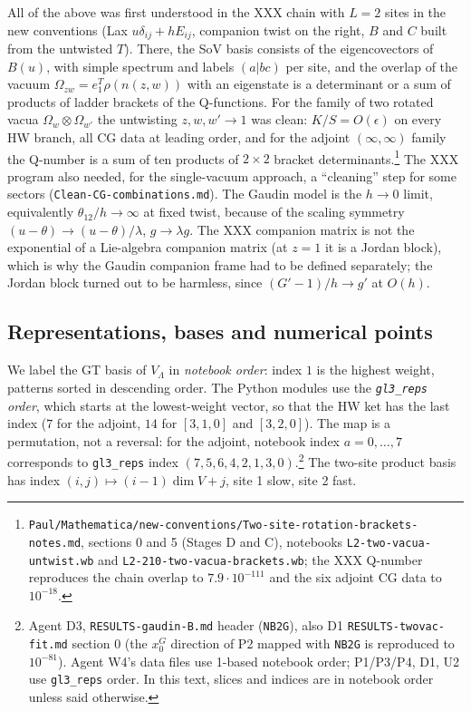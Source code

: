 \documentclass[11pt]{article}
\begin{document}
All of the above was first understood in the XXX chain with $L=2$ sites in the new conventions (Lax $u\delta_{ij}+hE_{ij}$, companion twist on the right, $B$ and $C$ built from the untwisted $T$).
There, the SoV basis consists of the eigencovectors of $B(u)$, with simple spectrum and labels $(a|bc)$ per site, and the overlap of the vacuum $\Omega_{zw}=e_1^T\rho(n(z,w))$ with an eigenstate is a determinant or a sum of products of ladder brackets of the Q-functions.
For the family of two rotated vacua $\Omega_w\otimes\Omega_{w'}$ the untwisting $z,w,w'\to1$ was clean: $K/S=O(\epsilon)$ on every HW branch, all CG data at leading order, and for the adjoint $(\infty,\infty)$ family the Q-number is a sum of ten products of $2\times2$ bracket determinants.\footnote{\texttt{Paul/\allowbreak{}Mathematica/\allowbreak{}new-\allowbreak{}conventions/\allowbreak{}Two-\allowbreak{}site-\allowbreak{}rotation-\allowbreak{}brackets-\allowbreak{}notes.\allowbreak{}md}, sections 0 and 5 (Stages D and C), notebooks \texttt{L2-\allowbreak{}two-\allowbreak{}vacua-\allowbreak{}untwist.\allowbreak{}wb} and \texttt{L2-\allowbreak{}210-\allowbreak{}two-\allowbreak{}vacua-\allowbreak{}brackets.\allowbreak{}wb}; the XXX Q-number reproduces the chain overlap to $7.9\cdot10^{-111}$ and the six adjoint CG data to $10^{-18}$.} The XXX program also needed, for the single-vacuum approach, a ``cleaning'' step for some sectors (\texttt{Clean-\allowbreak{}CG-\allowbreak{}combinations.\allowbreak{}md}).
The Gaudin model is the $h\to0$ limit, equivalently $\theta_{12}/h\to\infty$ at fixed twist, because of the scaling symmetry $(u-\theta)\to(u-\theta)/\lambda$, $g\to\lambda g$. The XXX companion matrix is not the exponential of a Lie-algebra companion matrix (at $z=1$ it is a Jordan block), which is why the Gaudin companion frame had to be defined separately; the Jordan block turned out to be harmless, since $(G'-1)/h\to g'$ at $O(h)$.

\subsection{Representations, bases and numerical points}\label{sec:points}

We label the GT basis of $V_\Lambda$ in \emph{notebook order}: index $1$ is the highest weight, patterns sorted in descending order.
The Python modules use the \emph{\texttt{gl3\_\allowbreak{}reps} order}, which starts at the lowest-weight vector, so that the HW ket has the last index ($7$ for the adjoint, $14$ for $[3,1,0]$ and $[3,2,0]$).
The map is a permutation, not a reversal: for the adjoint, notebook index $a=0,\dots,7$ corresponds to \texttt{gl3\_\allowbreak{}reps} index $(7,5,6,4,2,1,3,0)$.\footnote{Agent D3, \texttt{RESULTS-\allowbreak{}gaudin-\allowbreak{}B.\allowbreak{}md} header (\texttt{NB2G}), also D1 \texttt{RESULTS-\allowbreak{}twovac-\allowbreak{}fit.\allowbreak{}md} section 0 (the $x_0^G$ direction of P2 mapped with \texttt{NB2G} is reproduced to $10^{-81}$).
Agent W4's data files use 1-based notebook order; P1/P3/P4, D1, U2 use \texttt{gl3\_\allowbreak{}reps} order.
In this text, slices and indices are in notebook order unless said otherwise.} The two-site product basis has index $(i,j)\mapsto(i-1)\dim V+j$, site 1 slow, site 2 fast.
\end{document}
